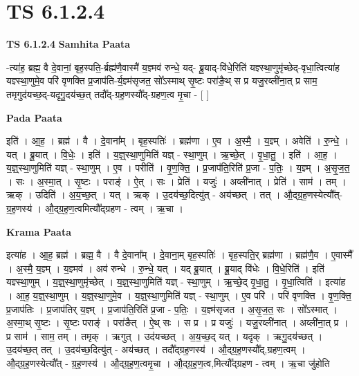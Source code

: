 \documentclass[17pt]{extarticle}
\begin{document}
\section{ TS 6.1.2.4 }

\textbf{TS 6.1.2.4 } \newline
\textbf{Samhita Paata} \newline

-त्या॑ह॒ ब्रह्म॒ वै दे॒वानां॒ बृह॒स्पति॒-र्ब्रह्म॑णै॒वास्मै॑ य॒ज्ञ्मव॑ रुन्धे॒ यद्- ब्रू॒याद्-वि॑धे॒रिति॑ यज्ञ्स्था॒णुमृ॑च्छेद्-वृधा॒त्वित्या॑ह यज्ञ्स्था॒णुमे॒व परि॑ वृणक्ति प्र॒जाप॑ति-र्य॒ज्ञ्म॑सृजत॒ सो᳚ऽस्माथ् सृ॒ष्टः परा॑ङै॒थ् स प्र यजु॒रव्ली॑ना॒त् प्र साम॒ तमृगुद॑यच्छ॒द्-यदृगु॒दय॑च्छ॒त् तदौ᳚द्-ग्रह॒णस्यौ᳚द्-ग्रहण॒त्व मृ॒चा - [  ] \newline

\textbf{Pada Paata} \newline

इति॑ । आ॒ह॒ । ब्रह्म॑ । वै । दे॒वाना᳚म् । बृह॒स्पतिः॑ । ब्रह्म॑णा । ए॒व । अ॒स्मै॒ । य॒ज्ञ्म् । अवेति॑ । रु॒न्धे॒ । यत् । ब्रू॒यात् । वि॒धेः॒ । इति॑ । य॒ज्ञ्॒स्था॒णुमिति॑ यज्ञ् - स्था॒णुम् । ऋ॒च्छे॒त् । वृ॒धा॒तु॒ । इति॑ । आ॒ह॒ । य॒ज्ञ्॒स्था॒णुमिति॑ यज्ञ् - स्था॒णुम् । ए॒व । परीति॑ । वृ॒ण॒क्ति॒ । प्र॒जाप॑ति॒रिति॑ प्र॒जा - प॒तिः॒ । य॒ज्ञ्म् । अ॒सृ॒ज॒त॒ । सः । अ॒स्मा॒त् । सृ॒ष्टः । पराङ्॑ । ऐ॒त् । सः । प्रेति॑ । यजुः॑ । अव्ली॑नात् । प्रेति॑ । साम॑ । तम् । ऋक् । उदिति॑ । अ॒य॒च्छ॒त् । यत् । ऋक् । उ॒दय॑च्छ॒दित्यु॑त् - अय॑च्छत् । तत् । औ॒द्ग्र॒ह॒णस्येत्यौ᳚त्-ग्र॒ह॒णस्य॑ । औ॒द्ग्र॒ह॒ण॒त्वमित्यौ᳚द्ग्रहण - त्वम् । ऋ॒चा ।  \newline


\textbf{Krama Paata} \newline

इत्या॑ह । आ॒ह॒ ब्रह्म॑ । ब्रह्म॒ वै । वै दे॒वाना᳚म् । दे॒वाना॒म् बृह॒स्पतिः॑ । बृह॒स्पति॒र् ब्रह्म॑णा । ब्रह्म॑णै॒व । ए॒वास्मै᳚ । अ॒स्मै॒ य॒ज्ञ्म् । य॒ज्ञ्मव॑ । अव॑ रुन्धे । रु॒न्धे॒ यत् । यद् ब्रू॒यात् । ब्रू॒याद् वि॑धेः । वि॒धे॒रिति॑ । इति॑ यज्ञ्स्था॒णुम् । य॒ज्ञ्॒स्था॒णुमृ॑च्छेत् । य॒ज्ञ्॒स्था॒णुमिति॑ यज्ञ् - स्था॒णुम् । ऋ॒च्छे॒द् वृ॒धा॒तु॒ । वृ॒धा॒त्विति॑ । इत्या॑ह । आ॒ह॒ य॒ज्ञ्॒स्था॒णुम् । य॒ज्ञ्॒स्था॒णुमे॒व । य॒ज्ञ्॒स्था॒णुमिति॑ यज्ञ् - स्था॒णुम् । ए॒व परि॑ । परि॑ वृणक्ति । वृ॒ण॒क्ति॒ प्र॒जाप॑तिः । प्र॒जाप॑तिर् य॒ज्ञ्म् । प्र॒जाप॑ति॒रिति॑ प्र॒जा - प॒तिः॒ । य॒ज्ञ्म॑सृजत । अ॒सृ॒ज॒त॒ सः । सो᳚ऽस्मात् । अ॒स्मा॒थ् सृ॒ष्टः । सृ॒ष्टः पराङ्॑ । परा॑ङैत् । ऐ॒थ् सः । स प्र । प्र यजुः॑ । यजु॒रव्ली॑नात् । अव्ली॑ना॒त् प्र । प्र साम॑ । साम॒ तम् । तमृक् । ऋगुत् । उद॑यच्छत् । अ॒य॒च्छ॒द् यत् । यदृक् । ऋगु॒दय॑च्छत् । उ॒दय॑च्छ॒त् तत् । उ॒दय॑च्छ॒दित्यु॑त् - अय॑च्छत् । तदौ᳚द्ग्रह॒णस्य॑ । औ॒द्ग्र॒ह॒णस्यौ᳚द्,ग्रहण॒त्वम् । औ॒द्ग्र॒ह॒णस्येत्यौ᳚त् - ग्र॒ह॒णस्य॑ । औ॒द्ग्र॒ह॒ण॒त्वमृ॒चा । औ॒द्ग्र॒ह॒ण॒त्व,मित्यौ᳚द्ग्रहण - त्वम् । ऋ॒चा जु॑होति \newline
\end{document}
